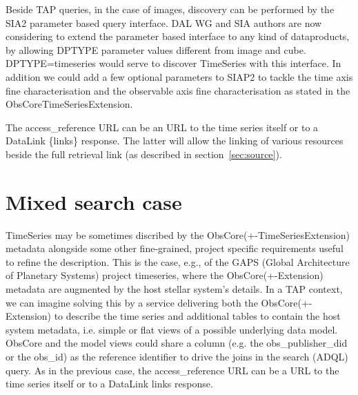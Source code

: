 \documentclass[11pt,a4paper]{ivoa}
\begin{document}
        Beside TAP queries, in the case of images, discovery can be performed by the SIA2 \citep{2015ivoa.spec.1223D} parameter based query interface. DAL WG and SIA authors are now considering to extend the parameter based interface to any kind of dataproducts, by allowing DPTYPE parameter values different from image and cube.
         DPTYPE=timeseries would serve to discover TimeSeries with this interface. 
       In addition we could  add a few optional parameters to SIAP2 to tackle the time axis fine characterisation and the observable axis fine characterisation as stated in the ObsCoreTimeSeriesExtension.  
    

         

        The access\_reference URL can be an URL to the time series itself or to a DataLink \{links\} response. The latter will allow the linking of various resources beside the full retrieval link (as described in section~\ref{sec:source}).

  

\section{Mixed search case}
\label{sec:mixed}

TimeSeries may be sometimes discribed by the ObsCore(+-TimeSeriesExtension) metadata alongside some other fine-grained, project specific requirements useful to refine the description. This is the case, e.g., of the GAPS (Global Architecture of Planetary Systems) project timeseries, where the ObsCore(+-Extension) metadata are augmented by the host stellar system's details.
In a TAP context, we can imagine solving this by a service delivering both the ObsCore(+-Extension) to describe the time series and additional tables to contain the host system metadata, i.e. simple or flat views of a possible underlying data model.
ObsCore and the model views could share a column (e.g. the obs\_publisher\_did or the obs\_id) as the reference identifier to drive the joins in the search (ADQL) query.
As in the previous case, the access\_reference URL can be a URL to the time series itself or to a DataLink {links} response.
\end{document}
